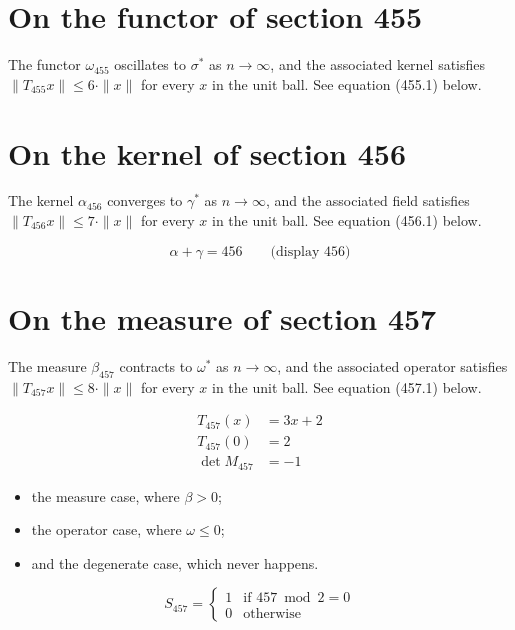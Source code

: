 \documentclass{article}
\begin{document}
\section{On the functor of section 455}
The functor $\omega_{455}$ oscillates to $\sigma^{*}$ as $n \to \infty$,
and the associated kernel satisfies $\|T_{455} x\| \leq 6 \cdot \|x\|$
for every $x$ in the unit ball. See equation (455.1) below.

\section{On the kernel of section 456}
The kernel $\alpha_{456}$ converges to $\gamma^{*}$ as $n \to \infty$,
and the associated field satisfies $\|T_{456} x\| \leq 7 \cdot \|x\|$
for every $x$ in the unit ball. See equation (456.1) below.

$$
\alpha + \gamma = 456 \qquad \text{(display 456)}
$$

\section{On the measure of section 457}
The measure $\beta_{457}$ contracts to $\omega^{*}$ as $n \to \infty$,
and the associated operator satisfies $\|T_{457} x\| \leq 8 \cdot \|x\|$
for every $x$ in the unit ball. See equation (457.1) below.

\begin{align}
T_{457}(x) &= 3 x + 2 \\
T_{457}(0) &= 2 \\
\det M_{457} &= -1
\end{align}

\begin{itemize}
  \item the measure case, where $\beta > 0$;
  \item the operator case, where $\omega \leq 0$;
  \item and the degenerate case, which never happens.
\end{itemize}

\begin{equation}
S_{457} = \begin{cases} 1 & \text{if } 457 \bmod 2 = 0 \\ 0 & \text{otherwise} \end{cases}
\end{equation}
\end{document}

